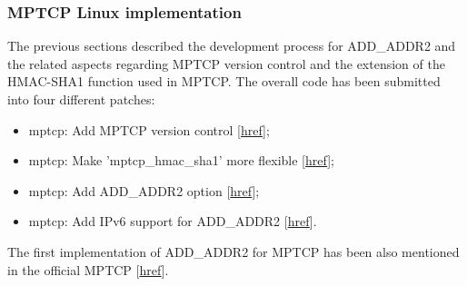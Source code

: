 \subsubsection{MPTCP Linux implementation}
The previous sections described the development process for ADD\_ADDR2 and the related aspects regarding MPTCP version control and the extension of the HMAC-SHA1 function used in MPTCP. 
The overall code has been submitted into four different patches:
\begin{itemize}
  \item mptcp: Add MPTCP version control [\href{https://github.com/multipath-tcp/mptcp/commit/c9b4b66a0e544b3eae5d898206b5a28628b728a7}{href}];
  \item mptcp: Make 'mptcp\_hmac\_sha1' more flexible [\href{https://github.com/multipath-tcp/mptcp/commit/f860de960e19cb557400c08e49288af63c51319f}{href}];
  \item mptcp: Add ADD\_ADDR2 option [\href{https://github.com/multipath-tcp/mptcp/commit/de09a83186666c67c9831057a83ba426f91fbea3}{href}];
  \item mptcp: Add IPv6 support for ADD\_ADDR2 [\href{https://github.com/multipath-tcp/mptcp/commit/8e86cf262108513296ac0952f2ffef717dc12f4b}{href}].
\end{itemize}

The first implementation of ADD\_ADDR2 for MPTCP has been also mentioned in the official MPTCP [\href{http://blog.multipath-tcp.org/blog/html/2016/01/05/mptcpnews.html#}{href}].

